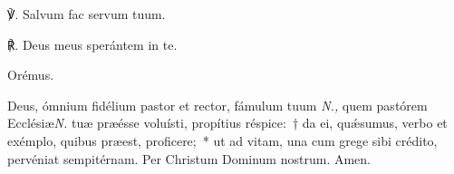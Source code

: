 ℣. Salvum fac servum tuum.

℟. Deus meus sperántem in te.

Orémus.

Deus, ómnium fidélium pastor et re\-ctor, fámulum tuum \textit{N.,} quem pastórem Ecclésiæ\thinspace \textit{N.} tuæ præésse voluísti, propítius réspice:~† da ei, quǽsumus, verbo et exémplo, quibus præest, proficere;~* ut ad vitam, una cum grege sibi crédito, pervéniat sempitérnam. Per Christum Dominum nostrum. Amen.